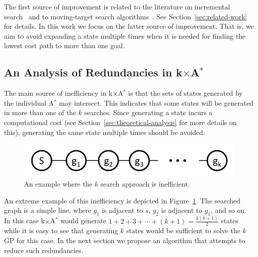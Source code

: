 \documentclass{aicom2e}
\newcommand{\kgs}{$k$GP}
\newcommand{\astar}{A$^*$}
\newcommand{\kxastar}{k$\times$A$^*$}
\begin{document}
The first source of improvement is related to the literature on incremental
search~\cite{koenig2004lifelong} and to moving-target search
algorithms~\cite{ishida1995moving,koenig2007speeding}. See
Section~\ref{sec:related-work} for details. In this work we focus on the latter
source of improvement. That is, we aim to avoid expanding a state multiple
times when it is needed for finding the lowest cost path to more than one goal.


\subsection{An Analysis of Redundancies in \kxastar{}}
The main source of inefficiency in \kxastar{} is that the sets of states
generated by the individual \astar{} may intersect. This indicates
that some states will be generated in more than one of the $k$ searches.
Since generating a state incurs a computational cost (see Section~\ref{sec:theoretical-analysis} for more details on this),
generating the same state multiple times should be avoided.

\begin{figure}
    \includegraphics[width=\columnwidth]{k-search-bad_cropped}
    \caption{An example where the $k$ search approach is inefficient.}
    \label{fig:k-search-bad}
\end{figure}
An extreme example of this inefficiency is depicted in
Figure~\ref{fig:k-search-bad}. The searched graph is a simple line, where $g_1$ is adjacent to $s$,
$g_2$ is adjacent to $g_1$, and so on. In this case \kxastar{} would generate
$1+2+3+\cdots+(k+1)=\frac{k(k+1)}{2}$ states while it is easy to see that
generating $k$ states would be sufficient to solve the \kgs{} for this case.
In the next section we propose an algorithm that attempts to reduce such redundancies. %
\end{document}
